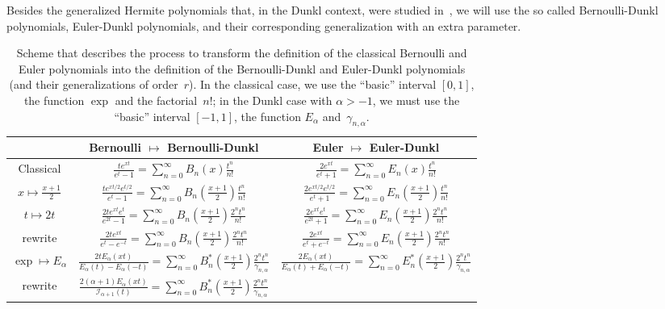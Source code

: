 \documentclass[a4paper]{amsart}
\newcommand{\I}{\mathcal{I}}
\newcommand{\Ea}{E_{\alpha}}
\newcommand{\cc}{\gamma}
\theoremstyle{plain}
\theoremstyle{definition}
\theoremstyle{remark}
\numberwithin{equation}{section}
\begin{document}
Besides the generalized Hermite polynomials that, in the Dunkl context, were studied in~\cite{Ros},  we will use the so called Bernoulli-Dunkl polynomials, Euler-Dunkl polynomials, and their corresponding generalization with an extra parameter. 

\begin{table}[!tb]
\caption{Scheme that describes the process to transform the definition 
of the classical Bernoulli and Euler polynomials into the definition 
of the Bernoulli-Dunkl and Euler-Dunkl polynomials 
(and their generalizations of order~$r$).
In the classical case, we use the ``basic'' interval $[0,1]$, 
the function $\exp$ and the factorial~$n!$; in the Dunkl case with $\alpha>-1$, 
we must use the ``basic'' interval $[-1,1]$, the function $\Ea$ and~$\cc_{n,\alpha}$.}
\newcommand{\suml}{\sum\limits}
\centering
\hspace*{-1cm}%
\begin{tabular}{ccc}
\hline
\rule[-4pt]{0pt}{14pt} & Bernoulli $\mapsto$ Bernoulli-Dunkl & Euler $\mapsto$ Euler-Dunkl 
\\
\hline
\rule{0pt}{15pt}
Classical %
& $\frac{te^{xt}}{e^t-1} = \suml_{n=0}^{\infty} B_n(x) \frac{t^n}{n!}$
& $\frac{2e^{xt}}{e^t+1} = \suml_{n=0}^{\infty} E_n(x) \frac{t^n}{n!}$
\\[9pt]
$x \mapsto \frac{x+1}{2}$
& $\frac{te^{xt/2}e^{t/2}}{e^t-1} = \suml_{n=0}^{\infty} B_n(\frac{x+1}{2}) \frac{t^n}{n!}$
& $\frac{2e^{xt/2}e^{t/2}}{e^t+1} = \suml_{n=0}^{\infty} E_n(\frac{x+1}{2}) \frac{t^n}{n!}$
\\
$t \mapsto 2t$
& $\frac{2te^{xt}e^{t}}{e^{2t}-1} = \suml_{n=0}^{\infty} B_n(\frac{x+1}{2}) \frac{2^n t^n}{n!}$
& $\frac{2e^{xt}e^{t}}{e^{2t}+1} = \suml_{n=0}^{\infty} E_n(\frac{x+1}{2}) \frac{2^n t^n}{n!}$
\\[9pt]
rewrite
& $\frac{2te^{xt}}{e^{t}-e^{-t}} = \suml_{n=0}^{\infty} B_n(\frac{x+1}{2}) \frac{2^n t^n}{n!}$
& $\frac{2e^{xt}}{e^t+e^{-t}} = \suml_{n=0}^{\infty} E_n(\frac{x+1}{2}) \frac{2^n t^n}{n!}$
\\[9pt]
$\exp \mapsto \Ea$ %
& $\frac{2t\Ea(xt)}{\Ea(t)-\Ea(-t)} 
= \suml_{n=0}^{\infty} B_{n}^{*}(\frac{x+1}{2}) \frac{2^n t^n}{\cc_{n,\alpha}}$
& $\frac{2\Ea(xt)}{\Ea(t)+\Ea(-t)} 
= \suml_{n=0}^{\infty} E_{n}^{*}(\frac{x+1}{2}) \frac{2^n t^n}{\cc_{n,\alpha}}$
\\[9pt]
rewrite
& $\frac{2(\alpha+1)\Ea(xt)}{\I_{\alpha+1}(t)} 
= \suml_{n=0}^{\infty} B_{n}^{*}(\frac{x+1}{2}) \frac{2^n t^n}{\cc_{n,\alpha}}$

\end{tabular}
\end{table}
\end{document}
